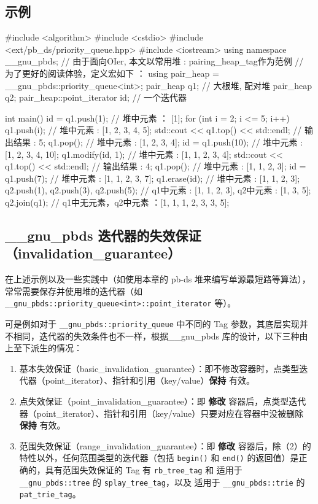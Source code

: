\subsection{示例}\label{ux793aux4f8b}


\begin{codeline}
#include <algorithm>
#include <cstdio>
#include <ext/pb_ds/priority_queue.hpp>
#include <iostream>
using namespace __gnu_pbds;
// 由于面向OIer, 本文以常用堆 : pairing_heap_tag作为范例
// 为了更好的阅读体验，定义宏如下 ：
using pair_heap = __gnu_pbds::priority_queue<int>;
pair_heap q1;  // 大根堆, 配对堆
pair_heap q2;
pair_heap::point_iterator id;  // 一个迭代器

int main() {
  id = q1.push(1);
  // 堆中元素 ： [1];
  for (int i = 2; i <= 5; i++) q1.push(i);
  // 堆中元素 :  [1, 2, 3, 4, 5];
  std::cout << q1.top() << std::endl;
  // 输出结果 : 5;
  q1.pop();
  // 堆中元素 : [1, 2, 3, 4];
  id = q1.push(10);
  // 堆中元素 : [1, 2, 3, 4, 10];
  q1.modify(id, 1);
  // 堆中元素 :  [1, 1, 2, 3, 4];
  std::cout << q1.top() << std::endl;
  // 输出结果 : 4;
  q1.pop();
  // 堆中元素 : [1, 1, 2, 3];
  id = q1.push(7);
  // 堆中元素 : [1, 1, 2, 3, 7];
  q1.erase(id);
  // 堆中元素 : [1, 1, 2, 3];
  q2.push(1), q2.push(3), q2.push(5);
  // q1中元素 : [1, 1, 2, 3], q2中元素 : [1, 3, 5];
  q2.join(q1);
  // q1中无元素，q2中元素 ：[1, 1, 1, 2, 3, 3, 5];
}
\end{codeline}


\subsection{\_\_gnu\_pbds 迭代器的失效保证（invalidation\_guarantee）}\label{gnu_pbds-ux8fedux4ee3ux5668ux7684ux5931ux6548ux4fddux8bc1invalidation_guarantee}

在上述示例以及一些实践中（如使用本章的 pb-ds 堆来编写单源最短路等算法），常常需要保存并使用堆的迭代器（如 \texttt{\_\_gnu\_pbds::priority\_queue\textless{}int\textgreater{}::point\_iterator} 等）。

可是例如对于 \texttt{\_\_gnu\_pbds::priority\_queue} 中不同的 Tag 参数，其底层实现并不相同，迭代器的失效条件也不一样，根据\_\_gnu\_pbds 库的设计，以下三种由上至下派生的情况：

\begin{enumerate}
\def\labelenumi{\arabic{enumi}.}
\item
  基本失效保证（basic\_invalidation\_guarantee）：即不修改容器时，点类型迭代器（point\_iterator）、指针和引用（key/value）\textbf{保持} 有效。
\item
  点失效保证（point\_invalidation\_guarantee）：即 \textbf{修改} 容器后，点类型迭代器（point\_iterator）、指针和引用（key/value）只要对应在容器中没被删除 \textbf{保持} 有效。
\item
  范围失效保证（range\_invalidation\_guarantee）：即 \textbf{修改} 容器后，除（2）的特性以外，任何范围类型的迭代器（包括 \texttt{begin()} 和 \texttt{end()} 的返回值）是正确的，具有范围失效保证的 Tag 有 \texttt{rb\_tree\_tag} 和 适用于 \texttt{\_\_gnu\_pbds::tree} 的 \texttt{splay\_tree\_tag}，以及 适用于 \texttt{\_\_gnu\_pbds::trie} 的 \texttt{pat\_trie\_tag}。
\end{enumerate}

